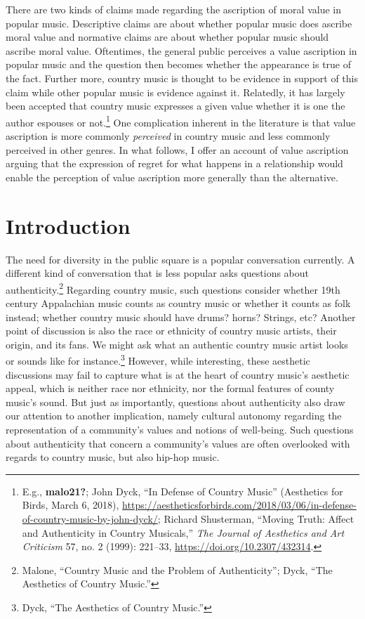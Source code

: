 \documentclass[phdthesis,12pt,final]{wuthesis}
\theoremstyle{definition}
\theoremstyle{definition}
\theoremstyle{definition}
\theoremstyle{definition}
\theoremstyle{remark}
\begin{document}
There are two kinds of claims made regarding the ascription of moral value in popular music. Descriptive claims are about whether popular music does ascribe moral value and normative claims are about whether popular music should ascribe moral value. Oftentimes, the general public perceives a value ascription in popular music and the question then becomes whether the appearance is true of the fact. Further more, country music is thought to be evidence in support of this claim while other popular music is evidence against it. Relatedly, it has largely been accepted that country music expresses a given value whether it is one the author espouses or not.\footnote{E.g., \textbf{malo21?}; John Dyck, {``In Defense of Country Music''} (Aesthetics for Birds, March 6, 2018), \url{https://aestheticsforbirds.com/2018/03/06/in-defense-of-country-music-by-john-dyck/}; Richard Shusterman, {``Moving {Truth}: {Affect} and {Authenticity} in {Country Musicals},''} \emph{The Journal of Aesthetics and Art Criticism} 57, no. 2 (1999): 221--33, \url{https://doi.org/10.2307/432314}.} One complication inherent in the literature is that value ascription is more commonly \emph{perceived} in country music and less commonly perceived in other genres. In what follows, I offer an account of value ascription arguing that the expression of regret for what happens in a relationship would enable the perception of value ascription more generally than the alternative.

\section{Introduction}\label{introduction}

The need for diversity in the public square is a popular conversation currently. A different kind of conversation that is less popular asks questions about authenticity.\footnote{Malone, {``Country {Music} and the {Problem} of {Authenticity}''}; Dyck, {``The Aesthetics of Country Music.''}} Regarding country music, such questions consider whether 19th century Appalachian music counts as country music or whether it counts as folk instead; whether country music should have drums? horns? Strings, etc? Another point of discussion is also the race or ethnicity of country music artists, their origin, and its fans. We might ask what an authentic country music artist looks or sounds like for instance.\footnote{Dyck, {``The Aesthetics of Country Music.''}} However, while interesting, these aesthetic discussions may fail to capture what is at the heart of country music's aesthetic appeal, which is neither race nor ethnicity, nor the formal features of county music's sound. But just as importantly, questions about authenticity also draw our attention to another implication, namely cultural autonomy regarding the representation of a community's values and notions of well-being. Such questions about authenticity that concern a community's values are often overlooked with regards to country music, but also hip-hop music.
\end{document}
